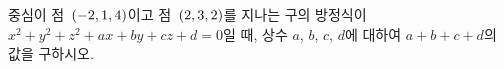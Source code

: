 중심이 점~$(-2{,}\mkern3mu\mathopen{}1{,}\mkern3mu\mathopen{}4)$이고 점~$(2{,}\mkern3mu\mathopen{}3{,}\mkern3mu\mathopen{}2)$를 지나는 구의 방정식이 $x^2+y^2+z^2+ax+by+cz+d=0$일 때, 상수 $a$, $b$, $c$, $d$에 대하여 $a+b+c+d$의 값을 구하시오.
